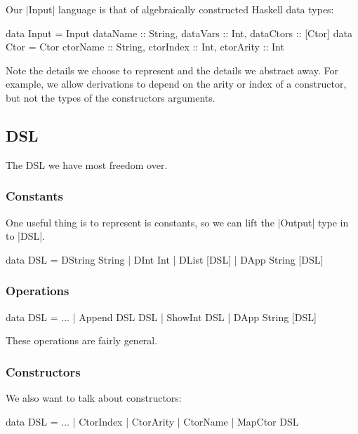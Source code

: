 \documentclass[preprint]{sigplanconf}
\begin{document}
Our |Input| language is that of algebraically constructed Haskell data types:

\begin{code}
data Input = Input {dataName :: String, dataVars :: Int, dataCtors :: [Ctor]}
data Ctor = Ctor {ctorName :: String, ctorIndex :: Int, ctorArity :: Int}
\end{code}

Note the details we choose to represent and the details we abstract away. For example, we allow derivations to depend on the arity or index of a constructor, but not the types of the constructors arguments.

\subsection{DSL}

The DSL we have most freedom over.

\subsubsection{Constants}

One useful thing is to represent is constants, so we can lift the |Output| type in to |DSL|.

\begin{code}
data DSL = DString String
         | DInt Int
         | DList [DSL]
         | DApp String [DSL]
\end{code}

\subsubsection{Operations}

\begin{code}
data DSL = ...
         | Append DSL DSL
         | ShowInt DSL
         | DApp String [DSL]
\end{code}

These operations are fairly general.

\subsubsection{Constructors}

We also want to talk about constructors:

\begin{code}
data DSL = ...
         | CtorIndex
         | CtorArity
         | CtorName
         | MapCtor DSL
\end{code}
\end{document}
